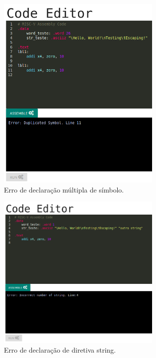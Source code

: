 	\begin{figure}[h]
	  \centering
	  \includegraphics[width=8cm]{img/assemble_error_duplicated_symbol.png}
	  \caption{Erro de declaração múltipla de símbolo.}
	  \label{fig:assemble_error_duplicated_symbol}
	\end{figure}


	\begin{figure}[h]
	  \centering	  
	  \includegraphics[width=8cm]{img/assemble_error_directives_strings.png}
	  \caption{Erro de declaração de diretiva string.}
	  \label{fig:assemble_error_directives_strings}
	\end{figure}


